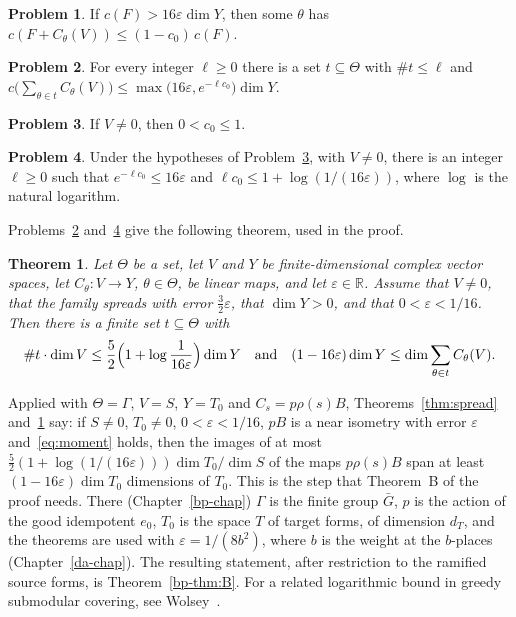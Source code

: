 \documentclass[reqno]{amsart}
\newcounter{chap}
\numberwithin{equation}{section}
\theoremstyle{definition}
\newtheorem{problem}{Problem}[section]
\theoremstyle{plain}
\newtheorem{theorem}{Theorem}[section]
\theoremstyle{remark}
\newcommand{\R}{\mathbb{R}}
\begin{document}
\begin{problem}\label{pr:greedy-step}
If \(c(F) > 16\varepsilon\dim Y\), then some \(\theta\) has \(c(F + C_\theta(V)) \le (1 - c_0)\,c(F)\).
\end{problem}

\begin{problem}\label{pr:greedy-iterate}
For every integer \(\ell \ge 0\) there is a set \(t \subseteq \Theta\) with \(\#t \le \ell\) and \(c\bigl(\sum_{\theta \in t} C_\theta(V)\bigr) \le \max\bigl(16\varepsilon, e^{-\ell c_0}\bigr)\dim Y\).
\end{problem}

\begin{problem}\label{pr:rate}
If \(V \ne 0\), then \(0 < c_0 \le 1\).
\end{problem}

\begin{problem}\label{pr:stopping}
Under the hypotheses of Problem~\ref{pr:rate}, with \(V\ne0\), there is an integer \(\ell\ge0\) such that \(e^{-\ell c_0}\le16\varepsilon\) and \(\ell c_0\le1+\log(1/(16\varepsilon))\), where \(\log\) is the natural logarithm.
\end{problem}

Problems~\ref{pr:greedy-iterate} and~\ref{pr:stopping} give the following theorem, used in the proof.

\begin{theorem}\label{thm:few}
Let \(\Theta\) be a set, let \(V\) and \(Y\) be finite-dimensional complex vector spaces, let \(C_\theta \colon V \to Y\), \(\theta \in \Theta\), be linear maps, and let \(\varepsilon \in \R\).  Assume that \(V \ne 0\), that the family spreads with error \(\frac32\varepsilon\), that \(\dim Y > 0\), and that \(0 < \varepsilon < 1/16\).  Then there is a finite set \(t \subseteq \Theta\) with
\[
  \#t \cdot \dim V \le \frac52 \Bigl( 1 + \log \frac{1}{16\varepsilon} \Bigr) \dim Y
  \quad\text{and}\quad
  (1 - 16\varepsilon)\dim Y \le \dim \sum_{\theta \in t} C_\theta(V) .
\]
\end{theorem}

Applied with \(\Theta = \Gamma\), \(V = S\), \(Y = T_0\) and \(C_s = p\rho(s)B\), Theorems~\ref{thm:spread} and~\ref{thm:few} say: if \(S \ne 0\), \(T_0 \ne 0\), \(0 < \varepsilon < 1/16\), \(pB\) is a near isometry with error \(\varepsilon\) and~\eqref{eq:moment} holds, then the images of at most \(\frac52(1 + \log(1/(16\varepsilon)))\dim T_0/\dim S\) of the maps \(p\rho(s)B\) span at least \((1 - 16\varepsilon)\dim T_0\) dimensions of \(T_0\).  This is the step that Theorem~B of the proof needs.  There (Chapter~\ref{bp-chap}) \(\Gamma\) is the finite group \(\bar G\), \(p\) is the action of the good idempotent \(e_0\), \(T_0\) is the space \(T\) of target forms, of dimension \(d_T\), and the theorems are used with \(\varepsilon=1/(8b^2)\), where \(b\) is the weight at the \(b\)-places (Chapter~\ref{da-chap}).  The resulting statement, after restriction to the ramified source forms, is Theorem~\ref{bp-thm:B}.  For a related logarithmic bound in greedy submodular covering, see Wolsey~\cite{Wo}.
\end{document}
